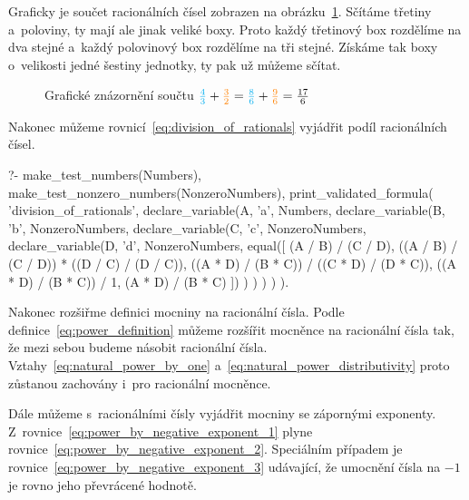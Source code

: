 Graficky je součet racionálních čísel zobrazen na obrázku~\ref{img:add_rational_numbers}. Sčítáme třetiny a~poloviny, ty mají ale jinak veliké boxy. Proto každý třetinový box rozdělíme na dva stejné a~každý polovinový box rozdělíme na tři stejné. Získáme tak boxy o~velikosti jedné šestiny jednotky, ty pak už můžeme sčítat.

\begin{figure}[!h]
\centering
{}
\caption{Grafické znázornění součtu \(\textcolor{cyan}{\frac{4}{3}} + \textcolor{orange}{\frac{3}{2}} = \textcolor{cyan}{\frac{8}{6}} + \textcolor{orange}{\frac{9}{6}} = \frac{17}{6}\)}
\label{img:add_rational_numbers}
\end{figure}

Nakonec můžeme rovnicí~\eqref{eq:division_of_rationals} vyjádřit podíl racionálních čísel.

\begin{prolog}
?-	make_test_numbers(Numbers),
	make_test_nonzero_numbers(NonzeroNumbers),
	print_validated_formula(
		'division_of_rationals',
		declare_variable(A, 'a', Numbers,
			declare_variable(B, 'b', NonzeroNumbers,
				declare_variable(C, 'c', NonzeroNumbers,
					declare_variable(D, 'd', NonzeroNumbers,
						equal([
							(A / B) / (C / D),
							((A / B) / (C / D)) * ((D / C) / (D / C)),
							((A * D) / (B * C)) / ((C * D) / (D * C)),
							((A * D) / (B * C)) / 1,
							(A * D) / (B * C)
						])
					)
				)
			)
		)
	).
\end{prolog}

Nakonec rozšiřme definici mocniny na racionální čísla. Podle definice~\eqref{eq:power_definition} můžeme rozšířit mocněnce na racionální čísla tak, že mezi sebou budeme násobit racionální čísla. Vztahy~\eqref{eq:natural_power_by_one} a~\eqref{eq:natural_power_distributivity} proto zůstanou zachovány i~pro racionální mocněnce.

Dále můžeme s~racionálními čísly vyjádřit mocniny se zápornými exponenty. Z~rovnice~\eqref{eq:power_by_negative_exponent_1} plyne rovnice~\eqref{eq:power_by_negative_exponent_2}. Speciálním případem je rovnice~\eqref{eq:power_by_negative_exponent_3} udávající, že umocnění čísla na \(-1\) je rovno jeho převrácené hodnotě.


